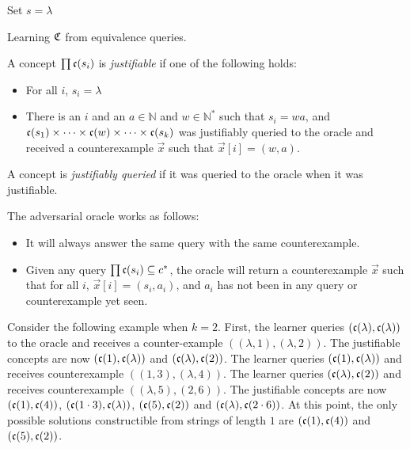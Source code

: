 \documentclass[11pt]{amsart}
\begin{document}
\begin{algorithm}[H]
\label{ntree}
\SetAlgoLined
\KwResult{}
Set $s = \lambda$\;
\caption{Learning $\mathfrak{C}$ from equivalence queries.}
\end{algorithm}



A concept $\prod \mathfrak{c}(s_i)$ is \emph{justifiable} if one of the following holds:
\begin{itemize}
\item For all $i$, $s_i = \lambda$
\item There is an $i$ and an $a \in \mathbb{N}$ and $w \in \mathbb{N}^*$ such that $s_i = wa$, and $\mathfrak{c}(s_1) \times \dots \times \mathfrak{c}(w) \times \dots \times \mathfrak{c}(s_k)$  was justifiably queried to the oracle and received a counterexample $\vec{x}$ such that $\vec{x}[i] = (w, a)$. 
\end{itemize}

A concept is \emph{justifiably queried} if it was queried to the oracle when it was justifiable. 

The adversarial oracle works as follows:
\begin{itemize}
\item It will always answer the same query with the same counterexample.  
\item Given any query $\prod \mathfrak{c}(s_i) \subseteq c^*$, the oracle will return a counterexample $\vec{x}$ such that for all $i$, $\vec{x}[i] = (s_i, a_i)$, and $a_i$ has not been in any query or counterexample yet seen.
\end{itemize}

Consider the following example when $k = 2$. 
First, the learner queries $(\mathfrak{c}(\lambda), \mathfrak{c}(\lambda))$ to the oracle and receives a counter-example $((\lambda, 1), (\lambda, 2))$. 
The justifiable concepts are now $(\mathfrak{c}(1), \mathfrak{c}(\lambda))$ and $(\mathfrak{c}(\lambda), \mathfrak{c}(2))$. 
The learner queries $(\mathfrak{c}(1), \mathfrak{c}(\lambda))$ and receives counterexample  $((1, 3), (\lambda, 4))$. 
 The learner queries $(\mathfrak{c}(\lambda), \mathfrak{c}(2))$ and receives counterexample $((\lambda, 5), (2, 6))$.
The justifiable concepts are now  $(\mathfrak{c}(1), \mathfrak{c}(4))$, $(\mathfrak{c}(1 \cdot 3), \mathfrak{c}(\lambda))$, $(\mathfrak{c}(5), \mathfrak{c}(2))$ and $(\mathfrak{c}(\lambda), \mathfrak{c}(2 \cdot 6))$.  
At this point, the only possible solutions constructible from strings of length $1$ are $(\mathfrak{c}(1), \mathfrak{c}(4))$ and $(\mathfrak{c}(5), \mathfrak{c}(2))$. 
\end{document}
